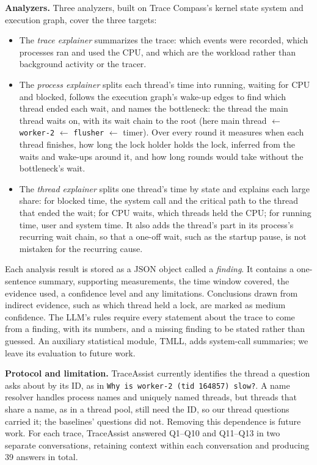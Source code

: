\documentclass[10pt,conference]{IEEEtran}
\newcommand{\sysname}{TraceAssist\xspace}
\begin{document}
\textbf{Analyzers.} Three analyzers, built on Trace Compass's kernel state system and execution graph, cover the three targets:
\begin{itemize}
  
  \item The \emph{trace explainer} summarizes the trace: which events were recorded, which processes ran and used the CPU, and which are the workload rather than background activity or the tracer.
  
  \item The \emph{process explainer} splits each thread's time into running, waiting for CPU and blocked, follows the execution graph's wake-up edges to find which thread ended each wait, and names the bottleneck: the thread the main thread waits on, with its wait chain to the root (here main thread $\leftarrow$ \texttt{worker-2} $\leftarrow$ \texttt{flusher} $\leftarrow$ timer). Over every round it measures when each thread finishes, how long the lock holder holds the lock, inferred from the waits and wake-ups around it, and how long rounds would take without the bottleneck's wait.
  
  \item The \emph{thread explainer} splits one thread's time by state and explains each large share: for blocked time, the system call and the critical path to the thread that ended the wait; for CPU waits, which threads held the CPU; for running time, user and system time. It also adds the thread's part in its process's recurring wait chain, so that a one-off wait, such as the startup pause, is not mistaken for the recurring cause.
  
\end{itemize}
Each analysis result is stored as a JSON object called a \emph{finding}. It contains a one-sentence summary, supporting measurements, the time window covered, the evidence used, a confidence level and any limitations. Conclusions drawn from indirect evidence, such as which thread held a lock, are marked as medium confidence. The LLM's rules require every statement about the trace to come from a finding, with its numbers, and a missing finding to be stated rather than guessed. An auxiliary statistical module, TMLL, adds system-call summaries; we leave its evaluation to future work.

\textbf{Protocol and limitation.} \sysname currently identifies the thread a question asks about by its ID, as in \texttt{Why is worker-2 (tid 164857) slow?}. A name resolver handles process names and uniquely named threads, but threads that share a name, as in a thread pool, still need the ID, so our thread questions carried it; the baselines' questions did not. Removing this dependence is future work. For each trace, \sysname answered Q1--Q10 and Q11--Q13 in two separate conversations, retaining context within each conversation and producing 39 answers in total.
\end{document}

